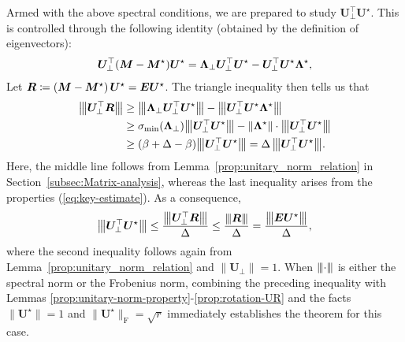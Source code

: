 Armed with the above spectral conditions, we are prepared to study $\bm{U}_{\perp}^{\top}\bm{U}^{\star}$.
This is controlled through the following identity (obtained by the definition of eigenvectors): 
%
\begin{align}
	\bm{U}_{\perp}^{\top} ({\boldsymbol M} - {\boldsymbol M}^\star) {\boldsymbol U}^\star = \bm{\Lambda}_{\perp}\bm{U}_{\perp}^{\top}\bm{U}^{\star}-\bm{U}_{\perp}^{\top}\bm{U}^{\star}\bm{\Lambda}^{\star}, \label{eq:sylvester}
\end{align}
Let ${\boldsymbol R} \coloneqq \left(\bm{M}-\bm{M}^{\star}\right)\bm{U}^{\star} = \bm{E} \bm{U}^{\star}$.
The triangle inequality then tells us that
%
\begin{align}
\vertiiibig{\bm{U}_{\perp}^{\top}\bm{R}} & \geq\vertiiibig{\bm{\Lambda}_{\perp}\bm{U}_{\perp}^{\top}\bm{U}^{\star}}-\vertiiibig{\bm{U}_{\perp}^{\top}\bm{U}^{\star}\bm{\Lambda}^{\star}} \notag\\
	& \geq  \sigma_{\min}(\bm{\Lambda}_{\perp})  \vertiiibig{\bm{U}_{\perp}^{\top}\bm{U}^{\star}}- \|\bm{\Lambda}^{\star}\| \cdot \vertiiibig{\bm{U}_{\perp}^{\top}\bm{U}^{\star}} \notag\\
	& \geq(\beta+\Delta-\beta)\vertiiibig{\bm{U}_{\perp}^{\top}\bm{U}^{\star}}= \Delta\,\vertiiibig{\bm{U}_{\perp}^{\top}\bm{U}^{\star}}.
	\label{eq:Uperp-R-LB-Delta1}
\end{align}
%
Here, the middle line follows from Lemma~\ref{prop:unitary_norm_relation} in Section~\ref{subsec:Matrix-analysis}, whereas the last inequality arises from the properties (\ref{eq:key-estimate}).
As a consequence,
%
\[
{\big\vert\kern-0.25ex\big\vert\kern-0.25ex\big\vert \bm{U}_{\perp}^{\top}\bm{U}^{\star} \big\vert\kern-0.25ex\big\vert\kern-0.25ex\big\vert}\leq\frac{{\big\vert\kern-0.25ex\big\vert\kern-0.25ex\big\vert \bm{U}_{\perp}^{\top}\bm{R} \big\vert\kern-0.25ex\big\vert\kern-0.25ex\big\vert}}{\Delta}\leq\frac{{\left\vert\kern-0.25ex\left\vert\kern-0.25ex\left\vert \bm{R} \right\vert\kern-0.25ex\right\vert\kern-0.25ex\right\vert}}{\Delta}=\frac{{\big\vert\kern-0.25ex\big\vert\kern-0.25ex\big\vert \bm{E}\bm{U}^{\star} \big\vert\kern-0.25ex\big\vert\kern-0.25ex\big\vert}}{\Delta},
\]
where the second inequality follows again from Lemma~\ref{prop:unitary_norm_relation} and $\|\bm{U}_{\perp}\|=1$.
%
When ${\left\vert\kern-0.25ex\left\vert\kern-0.25ex\left\vert \cdot \right\vert\kern-0.25ex\right\vert\kern-0.25ex\right\vert}$ is either the spectral norm or the Frobenius norm, combining the preceding inequality with Lemmas \ref{prop:unitary-norm-property}-\ref{prop:rotation-UR} and the facts $\|\bm{U}^{\star}\|=1$ and $\|\bm{U}^{\star}\|_{\mathrm{F}}=\sqrt{r}$ immediately establishes the theorem for this case.
%


